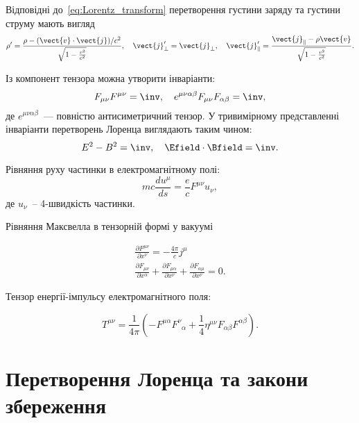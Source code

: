 \begin{Theory}
	Відповідні до~\eqref{eq:Lorentz_transform} перетворення густини заряду та густини струму мають вигляд
	\begin{equation}\label{eq:Lorentz_transform_j}
		\rho' = \frac{\rho - (\vect{v}\cdot\vect{j})/c^2}{\sqrt{1 - \frac{v^2}{c^2}}}, \quad \vect{j}'_{\perp} = \vect{j}_{\perp}, \quad
		\vect{j}'_{\parallel} = \frac{\vect{j}_{\parallel} - \rho \vect{v}} {\sqrt{1 - \frac{v^2}{c^2}}}.
	\end{equation}

	Із компонент тензора можна утворити інваріанти:
	\begin{equation*}
		F_{\mu\nu}F^{\mu\nu} = \inv, \quad e^{\mu\nu\alpha\beta}F_{\mu\nu}F_{\alpha\beta} = \inv,
	\end{equation*}
	де $e^{\mu\nu\alpha\beta}$~--- повністю антисиметричний тензор. У тривимірному представленні інваріанти перетворень Лоренца виглядають таким чином:
	\begin{equation*}
		E^2 - B^2 = \inv, \quad \Efield\cdot\Bfield = \inv.
	\end{equation*}

	Рівняння руху частинки в електромагнітному полі:
	\begin{equation}
		mc\frac{du^\mu}{ds} = \frac{e}{c}F^{\mu\nu}u_{\nu},
	\end{equation}
	де $u_{\nu}$~-- 4-швидкість частинки.

	Рівняння Максвелла в тензорній формі у вакуумі%

	\begin{gather}
		\frac{\partial F^{\mu\nu}}{\partial x^\nu} =                                                                                -\frac{4\pi}{c}j^\mu \label{eqn:rel_Maxwell_eqn_with_sources}\\
		\frac{\partial F_{\mu\nu}}{\partial x^\alpha} + \frac{\partial F_{\mu\alpha}}{\partial x^\nu} +\frac{\partial F_{\alpha\mu}}{\partial x^\nu}  = 0. \label{eqn:rel_Maxwell_eqn_with_sourceless}
	\end{gather}

	Тензор енергії-імпульсу електромагнітного поля:

	\begin{equation}\label{rel_TEI}
		T^{\mu\nu} = \frac{1}{4\pi}\left( -F^{\mu \alpha}F^\nu_{\;\;\alpha} + \frac14\eta^{\mu\nu}F_{\alpha\beta}F^{\alpha\beta}\right).
	\end{equation}
\end{Theory}

\section{Перетворення Лоренца та закони збереження}

